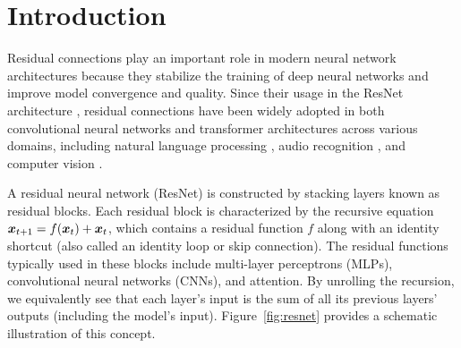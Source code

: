 \section{Introduction}
\label{sec:introduction}

Residual connections play an important role in modern neural network architectures because they stabilize the training of deep neural networks and improve model convergence and quality. Since their usage in the ResNet architecture \cite{he2016deep}, residual connections have been widely adopted in both convolutional neural networks and transformer architectures across various domains, including natural language processing \cite{vaswani2017attention}, audio recognition \cite{gong21b_interspeech}, and computer vision \cite{dosovitskiy2020image}.

A residual neural network (ResNet) is constructed by stacking layers known as residual blocks. Each residual block is characterized by the recursive equation $\bm{x}_{t+1} = f(\bm{x}_t) + \bm{x}_t$, which contains a residual function $f$ along with an identity shortcut (also called an identity loop or skip connection). The residual functions typically used in these blocks include multi-layer perceptrons (MLPs), convolutional neural networks (CNNs), and attention. 
By unrolling the recursion, we equivalently see that each layer's input
is the sum
of all its previous layers' outputs (including the model's input).
Figure~\ref{fig:resnet} provides a schematic illustration of this concept. 

